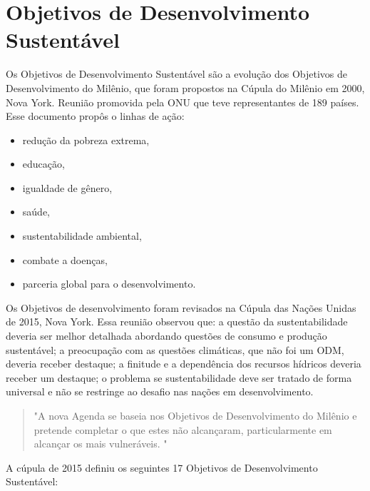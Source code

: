 \section{Objetivos de Desenvolvimento Sustentável}
Os Objetivos de Desenvolvimento Sustentável são a evolução dos Objetivos de Desenvolvimento do Milênio, que foram propostos na Cúpula do Milênio em 2000, Nova York. Reunião promovida pela ONU que teve representantes de 189 países. Esse documento propôs o linhas de ação:
\begin{itemize}
\item redução da pobreza extrema,                                                  
\item educação,                                                                    
\item igualdade de gênero,                                                         
\item saúde,                                                                       
\item sustentabilidade ambiental,                                                  
\item combate a doenças,                                                           
\item parceria global para o desenvolvimento.
\end{itemize}
Os Objetivos de desenvolvimento foram revisados na Cúpula das Nações Unidas de 2015, Nova York. Essa reunião  observou que: a questão da sustentabilidade deveria ser melhor detalhada abordando questões de consumo e produção sustentável; a preocupação com as questões climáticas, que não foi um ODM, deveria receber destaque; a finitude e a dependência dos recursos hídricos deveria receber um destaque; o problema se sustentabilidade deve ser tratado de forma universal e não se restringe ao desafio nas nações em desenvolvimento.
\begin{quotation}   	     	"A nova Agenda se baseia nos Objetivos de Desenvolvimento do Milênio e pretende completar o que estes não alcançaram, particularmente em alcançar os mais vulneráveis. "
\end{quotation}
A cúpula de 2015 definiu os seguintes 17 Objetivos de Desenvolvimento Sustentável:
